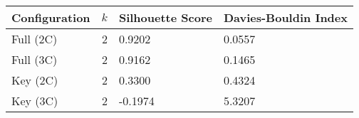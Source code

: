 \begin{tabular}{lrll}
\toprule
Configuration & $k$ & Silhouette Score & Davies-Bouldin Index \\
\midrule
Full (2C) & 2 & 0.9202 & 0.0557 \\
Full (3C) & 2 & 0.9162 & 0.1465 \\
Key (2C) & 2 & 0.3300 & 0.4324 \\
Key (3C) & 2 & -0.1974 & 5.3207 \\
\bottomrule
\end{tabular}
